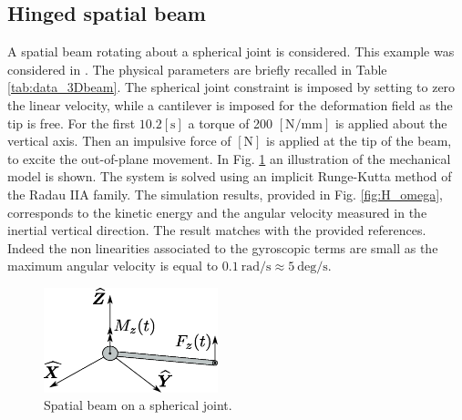 \documentclass{svjour3}                     %
\begin{document}
\subsection{Hinged spatial beam}
A spatial beam rotating about a spherical joint is considered. This example was considered in \cite{Cardona2000,Ellenbroek2018}. The physical parameters are briefly recalled in Table \ref{tab:data_3Dbeam}. The spherical joint constraint is imposed by setting to zero the linear velocity, while a cantilever is imposed for the deformation field as the tip is free. For the first $10.2 [\mathrm{s}]$ a torque of 200 $[\mathrm{N/mm}]$ is applied about the vertical axis. Then an impulsive force of $[\mathrm{N}]$ is applied at the tip of the beam, to excite the out-of-plane movement. In Fig. \ref{fig:beam_3D} an illustration of the mechanical model is shown. The system is solved using an implicit Runge-Kutta method of the Radau IIA family. The simulation results, provided in Fig. \ref{fig:H_omega}, corresponds to the kinetic energy and the angular velocity measured in the inertial vertical direction. The result matches with the provided references. Indeed the non linearities associated to the gyroscopic terms are small as the maximum angular velocity is equal to $0.1 \ \mathrm{rad/s} \approx 5 \ \mathrm{deg/s}$. 

\begin{figure}[tb]
	\centering
	\includegraphics[width=0.45\textwidth]{rotbeam_3D.eps} 
	\caption{Spatial beam on a spherical joint.}
	\label{fig:beam_3D}
\end{figure}
\end{document}
